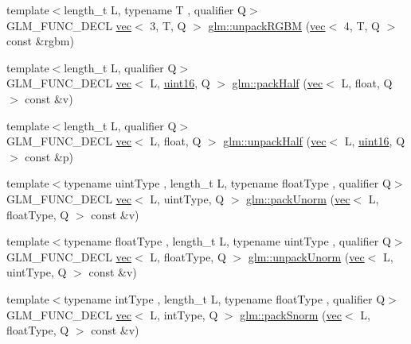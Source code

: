 \begin{DoxyCompactItemize}
\item 
{\footnotesize template$<$length\+\_\+t L, typename T , qualifier Q$>$ }\\G\+L\+M\+\_\+\+F\+U\+N\+C\+\_\+\+D\+E\+CL \hyperlink{structglm_1_1vec}{vec}$<$ 3, T, Q $>$ \hyperlink{group__gtc__packing_ga5c1ec97894b05ea21a05aea4f0204a02}{glm\+::unpack\+R\+G\+BM} (\hyperlink{structglm_1_1vec}{vec}$<$ 4, T, Q $>$ const \&rgbm)
\item 
{\footnotesize template$<$length\+\_\+t L, qualifier Q$>$ }\\G\+L\+M\+\_\+\+F\+U\+N\+C\+\_\+\+D\+E\+CL \hyperlink{structglm_1_1vec}{vec}$<$ L, \hyperlink{group__gtc__type__precision_gad8c2939e1fdd8e5828b31d95c52255d5}{uint16}, Q $>$ \hyperlink{group__gtc__packing_ga2d8bbce673ebc04831c1fb05c47f5251}{glm\+::pack\+Half} (\hyperlink{structglm_1_1vec}{vec}$<$ L, float, Q $>$ const \&v)
\item 
{\footnotesize template$<$length\+\_\+t L, qualifier Q$>$ }\\G\+L\+M\+\_\+\+F\+U\+N\+C\+\_\+\+D\+E\+CL \hyperlink{structglm_1_1vec}{vec}$<$ L, float, Q $>$ \hyperlink{group__gtc__packing_ga30d6b2f1806315bcd6047131f547d33b}{glm\+::unpack\+Half} (\hyperlink{structglm_1_1vec}{vec}$<$ L, \hyperlink{group__gtc__type__precision_gad8c2939e1fdd8e5828b31d95c52255d5}{uint16}, Q $>$ const \&p)
\item 
{\footnotesize template$<$typename uint\+Type , length\+\_\+t L, typename float\+Type , qualifier Q$>$ }\\G\+L\+M\+\_\+\+F\+U\+N\+C\+\_\+\+D\+E\+CL \hyperlink{structglm_1_1vec}{vec}$<$ L, uint\+Type, Q $>$ \hyperlink{group__gtc__packing_gaccd3f27e6ba5163eb7aa9bc8ff96251a}{glm\+::pack\+Unorm} (\hyperlink{structglm_1_1vec}{vec}$<$ L, float\+Type, Q $>$ const \&v)
\item 
{\footnotesize template$<$typename float\+Type , length\+\_\+t L, typename uint\+Type , qualifier Q$>$ }\\G\+L\+M\+\_\+\+F\+U\+N\+C\+\_\+\+D\+E\+CL \hyperlink{structglm_1_1vec}{vec}$<$ L, float\+Type, Q $>$ \hyperlink{group__gtc__packing_ga3e6ac9178b59f0b1b2f7599f2183eb7f}{glm\+::unpack\+Unorm} (\hyperlink{structglm_1_1vec}{vec}$<$ L, uint\+Type, Q $>$ const \&v)
\item 
{\footnotesize template$<$typename int\+Type , length\+\_\+t L, typename float\+Type , qualifier Q$>$ }\\G\+L\+M\+\_\+\+F\+U\+N\+C\+\_\+\+D\+E\+CL \hyperlink{structglm_1_1vec}{vec}$<$ L, int\+Type, Q $>$ \hyperlink{group__gtc__packing_gaa54b5855a750d6aeb12c1c902f5939b8}{glm\+::pack\+Snorm} (\hyperlink{structglm_1_1vec}{vec}$<$ L, float\+Type, Q $>$ const \&v)

\end{DoxyCompactItemize}
